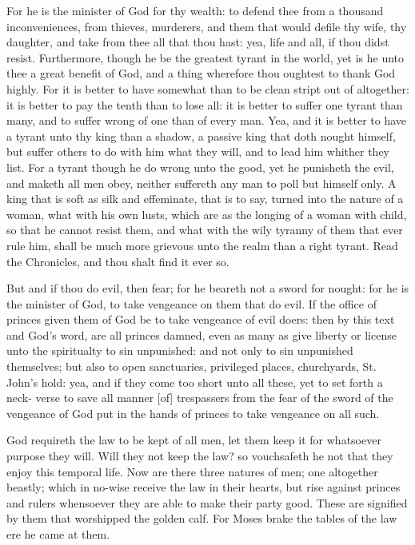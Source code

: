 For he is the minister of God for thy wealth: to defend 
thee from a thousand inconveniences, from thieves, murderers,
and them that would defile thy wife, thy daughter, 
and take from thee all that thou hast: yea, life and all, 
if thou didst resist. Furthermore, though he be the 
greatest tyrant in the world, yet is he unto thee a great 
benefit of God, and a thing wherefore thou oughtest to 
thank God highly. For it is better to have somewhat 
than to be clean stript out of altogether: it is better 
to pay the tenth than to lose all: it is better to 
suffer one tyrant than many, and to suffer wrong of one 
than of every man. Yea, and it is better to have a tyrant 
unto thy king than a shadow, a passive king that doth 
nought himself, but suffer others to do with him what they 
will, and to lead him whither they list. For a tyrant 
though he do wrong unto the good, yet he punisheth the 
evil, and maketh all men obey, neither suffereth any man 
to poll but himself only. A king that is soft as silk and 
effeminate, that is to say, turned into the nature of a 
woman, what with his own lusts, which are as the longing 
of a woman with child, so that he cannot resist them, and 
what with the wily tyranny of them that ever rule him, shall 
be much more grievous unto the realm than a right tyrant. 
Read the Chronicles, and thou shalt find it ever so.

But and if thou do evil, then fear; for he beareth not 
a sword for nought: for he is the minister of God, to 
take vengeance on them that do evil. If the office of 
princes given them of God be to take vengeance of evil 
doers: then by this text and God's word, are all princes 
damned, even as many as give liberty or license unto the 
spiritualty to sin unpunished: and not only to sin unpunished
themselves; but also to open sanctuaries, privileged
places, churchyards, St. John's hold: yea, and if 
they come too short unto all these, yet to set forth a neck- 
verse to save all manner [of] trespassers from the fear of the 
sword of the vengeance of God put in the hands of princes 
to take vengeance on all such. 

God requireth the law to be kept of all men, let them
keep it for whatsoever purpose they will. Will they not 
keep the law? so vouchsafeth he not that they enjoy this
temporal life. Now are there three natures of men; one 
altogether beastly; which in no-wise receive the law in 
their hearts, but rise against princes and rulers whensoever 
they are able to make their party good. These are signified
by them that worshipped the golden calf. For 
Moses brake the tables of the law ere he came at 
them.

